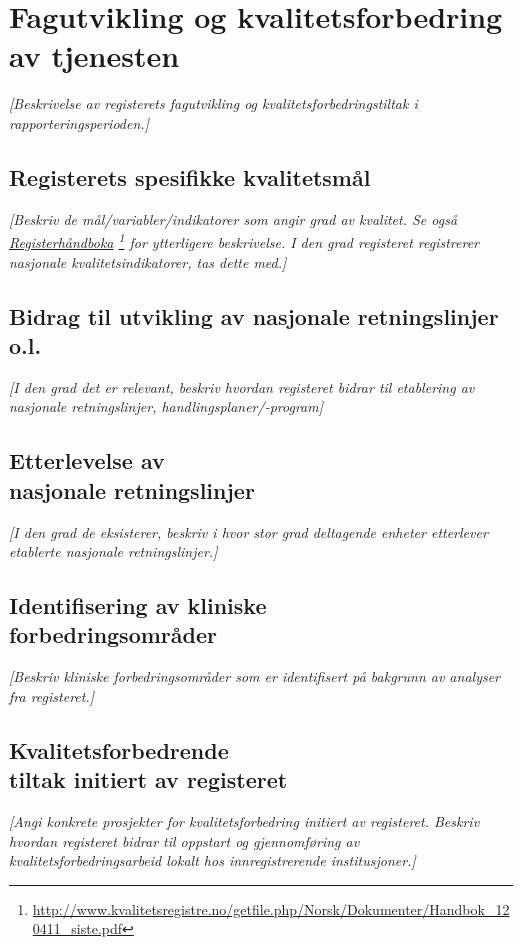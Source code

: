 \documentclass[norsk, a4paper, twocolumn]{report}
\newcommand{\guide}[1] {
	\textit{[\textcolor{guidegray}{#1}]}
	}
\begin{document}
\chapter{Fagutvikling og kvalitetsforbedring av tjenesten}\label{cha:fag}
\guide{Beskrivelse av registerets fagutvikling og kvalitetsforbedringstiltak
i rapporteringsperioden.}

\section{Registerets spesifikke kvalitetsmål}\label{sec:regspe}
\guide{Beskriv de mål/variabler/indikatorer som angir grad av kvalitet.
Se også
\href{http://www.kvalitetsregistre.no/getfile.php/Norsk/Dokumenter/Handbok_120411_siste.pdf}{Registerhåndboka}
\footnote{\url{http://www.kvalitetsregistre.no/getfile.php/Norsk/Dokumenter/Handbok_120411_siste.pdf}}
for ytterligere beskrivelse. I den grad registeret registrerer nasjonale
kvalitetsindikatorer, tas dette med.}





\section{Bidrag til utvikling av nasjonale retningslinjer o.l.}\label{sec:retut}
\guide{I den grad det er relevant, beskriv hvordan registeret bidrar til
etablering av nasjonale retningslinjer, handlingsplaner/-program}

\section{Etterlevelse av\\nasjonale retningslinjer}\label{sec:retbru}
\guide{I den grad de eksisterer, beskriv i hvor stor grad deltagende enheter
etterlever etablerte nasjonale retningslinjer.}

\section{Identifisering av kliniske\\forbedringsområder}\label{sec:ide}
\guide{Beskriv kliniske forbedringsområder som er identifisert på bakgrunn
av analyser fra registeret.}

\section{Kvalitetsforbedrende\\tiltak initiert av registeret}\label{sec:brures}
\guide{Angi konkrete prosjekter
for kvalitetsforbedring initiert av registeret. Beskriv
hvordan registeret bidrar til oppstart og gjennomføring
av kvalitetsforbedringsarbeid lokalt hos innregistrerende institusjoner.}
\end{document}
